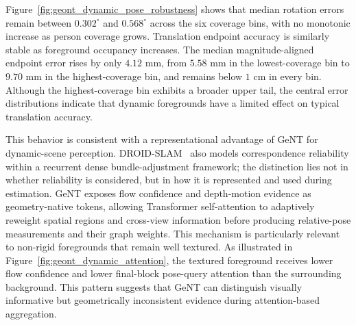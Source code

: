 Figure~\ref{fig:geont_dynamic_pose_robustness} shows that median rotation errors remain between $0.302^{\circ}$ and $0.568^{\circ}$ across the six coverage bins, with no monotonic increase as person coverage grows.
Translation endpoint accuracy is similarly stable as foreground occupancy increases.
The median magnitude-aligned endpoint error rises by only $4.12$ mm, from $5.58$ mm in the lowest-coverage bin to $9.70$ mm in the highest-coverage bin, and remains below $1$ cm in every bin.
Although the highest-coverage bin exhibits a broader upper tail, the central error distributions indicate that dynamic foregrounds have a limited effect on typical translation accuracy.

This behavior is consistent with a representational advantage of GeNT for dynamic-scene perception.
DROID-SLAM~\cite{teed2021droid} also models correspondence reliability within a recurrent dense bundle-adjustment framework; the distinction lies not in whether reliability is considered, but in how it is represented and used during estimation.
GeNT exposes flow confidence and depth-motion evidence as geometry-native tokens, allowing Transformer self-attention to adaptively reweight spatial regions and cross-view information before producing relative-pose measurements and their graph weights.
This mechanism is particularly relevant to non-rigid foregrounds that remain well textured.
As illustrated in Figure~\ref{fig:geont_dynamic_attention}, the textured foreground receives lower flow confidence and lower final-block pose-query attention than the surrounding background.
This pattern suggests that GeNT can distinguish visually informative but geometrically inconsistent evidence during attention-based aggregation.


